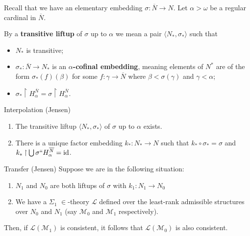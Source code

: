 \documentclass[utf8x,xcolor=svgnames,8pt]{beamer}
\newcommand{\N}{{\overline{N}}}
\newcommand{\id}{\textup{\ensuremath{\text{id}}}}
\newcommand{\To}{\longrightarrow}
\newcommand{\rest}{\mathbin{\upharpoonright}}
\begin{document}
\begin{frame} %

Recall that we have an elementary embedding $\sigma:\N \To N$. Let $\alpha > \omega$ be a regular cardinal in $\N$. 

\begin{definition}
By a \textbf{transitive liftup} of $\sigma$ up to $\alpha$ we mean a pair $\langle N_* , \sigma_* \rangle$ such that 
\begin{itemize} 
	\item $N_*$ is transitive;
	\item $\sigma_*:\N \To N_*$ is an \textbf{$\alpha$-cofinal embedding}, meaning elements of $N^*$ are of the form $\sigma_*(f)(\beta)$ for some $f: \gamma \To \N$ where $\beta < \sigma(\gamma)$ and $\gamma<\alpha$;
	\item $\sigma_* \upharpoonright H_{\alpha}^{\N}= \sigma \upharpoonright H_{\alpha}^{\N}$. 
\end{itemize}
\end{definition}

\begin{block}{Interpolation (Jensen)}
\begin{enumerate}
	\item The transitive liftup $\langle N_*, \sigma_* \rangle$ of $\sigma$ up to $\alpha$ exists.
	\item There is a unique factor embedding $k_*:N_*  \To N$ such that $k_* \circ \sigma_* = \sigma$ and $k_* \rest \bigcup \sigma `` H^{\N}_\alpha = \id$.
\end{enumerate}
\end{block} 

\begin{block}{Transfer (Jensen)}
Suppose we are in the following situation:
\begin{enumerate}
	\item $N_1$ and $N_0$ are both liftups of $\sigma$ with $k_1: N_1 \To N_0$
	\item We have a $\Sigma_1$  $\in$-theory $\mathcal L$ defined over the least-rank admissible structures over $N_0$ and $N_1$ (say $\mathcal M_0$ and $\mathcal M_1$ respectively).
\end{enumerate}
Then, 
if $\mathcal L(\mathcal M_1)$ is consistent, it follows that $\mathcal L(\mathcal M_0)$ is also consistent. 
\end{block} 

\end{frame}
\end{document}
